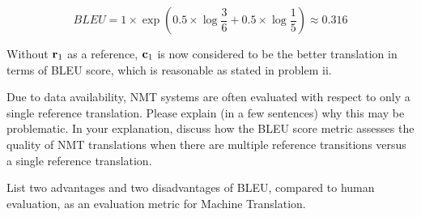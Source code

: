 \begin{parts}
\begin{subparts}
{            $$
                BLEU = 1 \times \exp(0.5 \times \log{\frac{3}{6}} + 0.5 \times \log{\frac{1}{5}}) \approx 0.316
            $$
            

            Without $\mathbf{r}_1$ as a reference, $\mathbf{c}_1$ is now considered to be the better translation in terms of BLEU score, which is reasonable as stated in problem ii.
        }
        
        
        \subpart[2] Due to data availability, NMT systems are often evaluated with respect to only a single reference translation. Please explain (in a few sentences) why this may be problematic. In your explanation, discuss how the BLEU score metric assesses the quality of NMT translations when there are multiple reference transitions versus a single reference translation.
        
        
        
        \subpart[2] List two advantages and two disadvantages of BLEU, compared to human evaluation, as an evaluation metric for Machine Translation. 
        

\end{subparts}
\end{parts}
